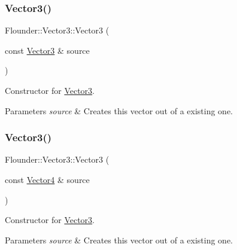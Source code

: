 \subsubsection{\texorpdfstring{Vector3()}{Vector3()}\hspace{0.1cm}{\footnotesize\ttfamily [3/5]}}
{\footnotesize\ttfamily Flounder\+::\+Vector3\+::\+Vector3 (\begin{DoxyParamCaption}\item[{const \hyperlink{class_flounder_1_1_vector3}{Vector3} \&}]{source }\end{DoxyParamCaption})}



Constructor for \hyperlink{class_flounder_1_1_vector3}{Vector3}. 


\begin{DoxyParams}{Parameters}
{\em source} & Creates this vector out of a existing one. \\
\hline
\end{DoxyParams}
\mbox{\label{class_flounder_1_1_vector3_a210b1c815bbec1cf02263e224f0c3732}} 
\subsubsection{\texorpdfstring{Vector3()}{Vector3()}\hspace{0.1cm}{\footnotesize\ttfamily [4/5]}}
{\footnotesize\ttfamily Flounder\+::\+Vector3\+::\+Vector3 (\begin{DoxyParamCaption}\item[{const \hyperlink{class_flounder_1_1_vector4}{Vector4} \&}]{source }\end{DoxyParamCaption})}



Constructor for \hyperlink{class_flounder_1_1_vector3}{Vector3}. 


\begin{DoxyParams}{Parameters}
{\em source} & Creates this vector out of a existing one. \\
\hline
\end{DoxyParams}
\mbox{\label{class_flounder_1_1_vector3_a4fb6857c48f2c1d68a3fcae74c2c8636}} 
